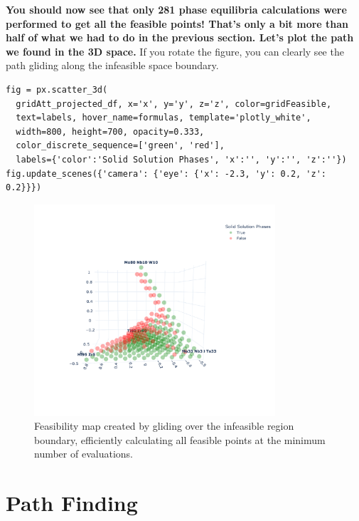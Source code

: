 \textbf{You should now see that only 281 phase equilibria calculations
were performed to get all the feasible points! That's only a bit more
than half of what we had to do in the previous section. Let's plot the
path we found in the 3D space.} If you rotate the figure, you can
clearly see the path gliding along the infeasible space boundary.

\begin{verbatim}
fig = px.scatter_3d(
  gridAtt_projected_df, x='x', y='y', z='z', color=gridFeasible, 
  text=labels, hover_name=formulas, template='plotly_white', 
  width=800, height=700, opacity=0.333, 
  color_discrete_sequence=['green', 'red'], 
  labels={'color':'Solid Solution Phases', 'x':'', 'y':'', 'z':''})
fig.update_scenes({'camera': {'eye': {'x': -2.3, 'y': 0.2, 'z': 0.2}}})
\end{verbatim}

\begin{figure}[H]
    \centering
    \includegraphics[width=0.8\textwidth]{nimplextutorial2/02.AdditiveManufacturingPathPlanning_40_1.pdf}
    \caption{Feasibility map created by gliding over the infeasible region boundary, efficiently calculating all feasible points at the minimum number of evaluations.}
    \label{nimplextutorial2:fig:infeasibilityglide}
\end{figure}

\section{Path Finding}\label{nimplextutorial2:path-finding}

